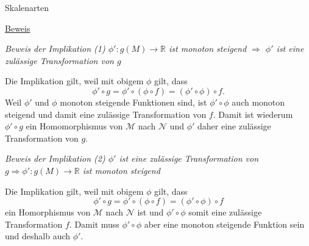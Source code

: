 \documentclass[
  8pt,
  ignorenonframetext,
]{beamer}
\begin{document}
\begin{frame}{Skalenarten}
\protect\hypertarget{skalenarten-7}{}
\footnotesize

\underline{Beweis}

\emph{Beweis der Implikation (1) \(\phi' : g(M) \to \mathbb{R}\) ist
monoton steigend \(\Rightarrow\) \(\phi'\) ist eine zulässige
Transformation von \(g\)}

Die Implikation gilt, weil mit obigem \(\phi\) gilt, dass
\begin{equation}
\phi' \circ g = \phi' \circ (\phi \circ f) = (\phi' \circ \phi) \circ f.
\end{equation} Weil \(\phi'\) und \(\phi\) monoton steigende Funktionen
sind, ist \(\phi' \circ \phi\) auch monoton steigend und damit eine
zulässige Transformation von \(f\). Damit ist wiederum \(\phi'\circ g\)
ein Homomorphismus von \(\mathcal{M}\) nach \(\mathcal{N}\) und
\(\phi'\) daher eine zulässige Transformation von \(g\). \vspace{1mm}

\emph{Beweis der Implikation (2) \(\phi'\) ist eine zulässige
Transformation von \(g \Rightarrow \phi' : g(M) \to \mathbb{R}\) ist
monoton steigend}

Die Implikation gilt, weil mit obigem \(\phi\) gilt, dass
\begin{equation}
\phi' \circ g = \phi' \circ (\phi \circ f) = (\phi' \circ \phi) \circ f
\end{equation} ein Homorphismus von \(\mathcal{M}\) nach \(\mathcal{N}\)
ist und \(\phi' \circ \phi\) somit eine zulässige Transformation \(f\).
Damit muss \(\phi' \circ \phi\) aber eine monoton steigende Funktion
sein und deshalb auch \(\phi'\).
\end{frame}
\end{document}
